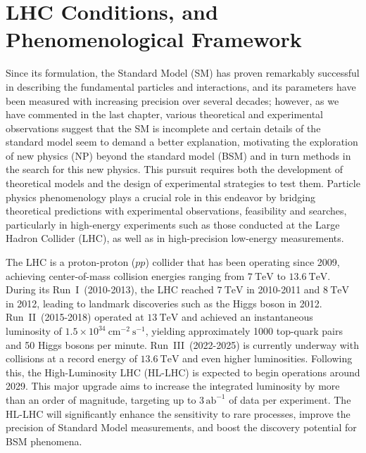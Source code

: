 \chapter{LHC Conditions, and Phenomenological Framework}

Since its formulation, the Standard Model (SM) has proven remarkably successful in describing the fundamental particles and interactions, and its parameters have been measured with increasing precision over several decades; however, as we have commented in the last chapter, various theoretical and experimental observations suggest that the SM is incomplete and certain details of the standard model seem to demand a better explanation, motivating the exploration of new physics (NP) beyond the standard model (BSM) and in turn methods in the search for this new physics. This pursuit requires both the development of theoretical models and the design of experimental strategies to test them. Particle physics phenomenology plays a crucial role in this endeavor by bridging theoretical predictions with experimental observations, feasibility and searches, particularly in high-energy experiments such as those conducted at the Large Hadron Collider (LHC), as well as in high-precision low-energy measurements.

The LHC is a proton-proton ($pp$) collider that has been operating since 2009, achieving center-of-mass collision energies ranging from $7~\mathrm{TeV}$ to $13.6~\mathrm{TeV}$. During its Run~I~(2010-2013), the LHC reached $7~\mathrm{TeV}$ in 2010-2011 and $8~\mathrm{TeV}$ in 2012, leading to landmark discoveries such as the Higgs boson in 2012. Run~II~(2015-2018) operated at $13~\mathrm{TeV}$ and achieved an instantaneous luminosity of $1.5 \times 10^{34}~\mathrm{cm}^{-2}~\mathrm{s}^{-1}$, yielding approximately 1000 top-quark pairs and 50 Higgs bosons per minute. Run~III~(2022-2025) is currently underway with collisions at a record energy of $13.6~\mathrm{TeV}$ and even higher luminosities. Following this, the High-Luminosity LHC (HL-LHC) is expected to begin operations around 2029. This major upgrade aims to increase the integrated luminosity by more than an order of magnitude, targeting up to $3\,\mathrm{ab}^{-1}$ of data per experiment. The HL-LHC will significantly enhance the sensitivity to rare processes, improve the precision of Standard Model measurements, and boost the discovery potential for BSM phenomena.

